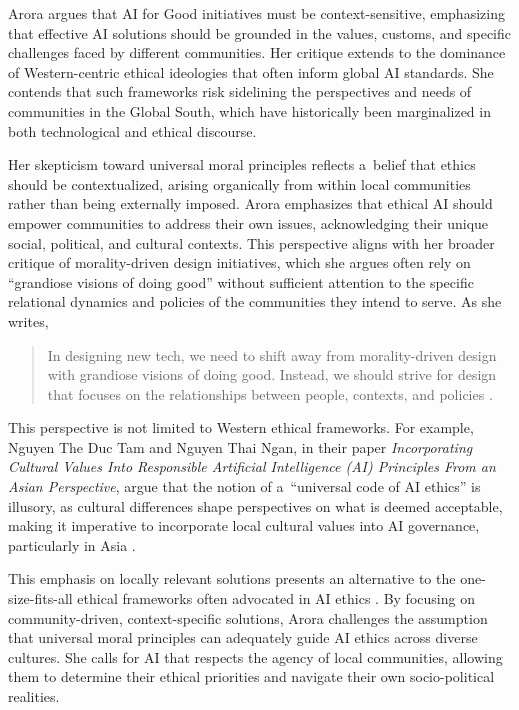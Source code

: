 \documentclass[%
  manuscript=article,
  year=2024,
  volume=77,
  doi=00000.000,
]{zfn}
\begin{document}
Arora argues that AI for Good initiatives must be context-sensitive, emphasizing that effective AI solutions should be grounded in the values, customs, and specific challenges faced by different communities. Her critique extends to the dominance of Western-centric ethical ideologies that often inform global AI standards. She contends that such frameworks risk sidelining the perspectives and needs of communities in the Global South, which have historically been marginalized in both technological and ethical discourse.



Her skepticism toward universal moral principles reflects a~belief that ethics should be contextualized, arising organically from within local communities rather than being externally imposed. Arora emphasizes that ethical AI should empower communities to address their own issues, acknowledging their unique social, political, and cultural contexts. This perspective aligns with her broader critique of morality-driven design initiatives, which she argues often rely on ``grandiose visions of doing good'' without sufficient attention to the specific relational dynamics and policies of the communities they intend to serve. As she writes,



\begin{quote}
In designing new tech, we need to shift away from morality-driven design with grandiose visions of doing good. Instead, we should strive for design that focuses on the relationships between people, contexts, and policies 
\parencite[][]{arora_pessimism_2024}.%
\end{quote}




This perspective is not limited to Western ethical frameworks. For example, Nguyen The Duc Tam and Nguyen Thai Ngan, in their paper \textit{Incorporating Cultural Values Into Responsible Artificial Intelligence (AI) Principles From an Asian Perspective}, argue that the notion of a~``universal code of AI ethics'' is illusory, as cultural differences shape perspectives on what is deemed acceptable, making it imperative to incorporate local cultural values into AI governance, particularly in Asia 
\parencite[][]{tam_incorporating_2023}.%




This emphasis on locally relevant solutions presents an alternative to the one-size-fits-all ethical frameworks often advocated in AI ethics 
\parencite[][]{world_economic_forum_ai_2024}. %
 By focusing on community-driven, context-specific solutions, Arora challenges the assumption that universal moral principles can adequately guide AI ethics across diverse cultures. She calls for AI that respects the agency of local communities, allowing them to determine their ethical priorities and navigate their own socio-political realities.
\end{document}
